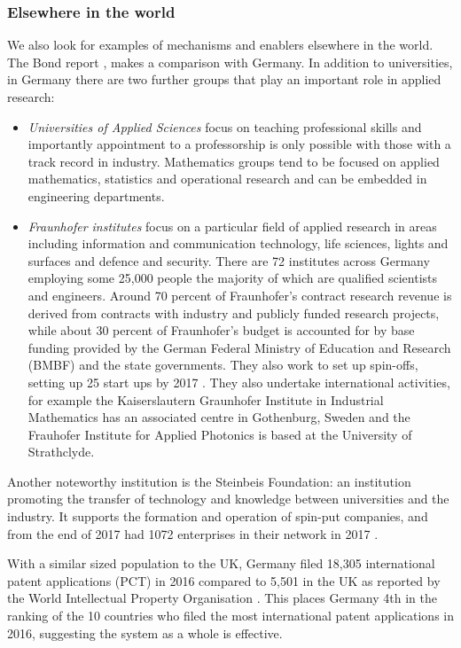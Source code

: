 \documentclass[11pt]{article} %
\begin{document}
	\subsubsection{Elsewhere in the world }	
	
	We also look for examples of mechanisms and enablers  elsewhere in the world. The Bond report \cite{Bond}, makes a comparison with Germany.   In addition to universities, in Germany there are two further groups that play an important role in applied research:
	\begin{itemize}
		\item \textit{Universities of Applied Sciences} focus on teaching professional skills and importantly appointment to a professorship is only possible with those with a track record in industry. Mathematics groups tend to be focused on applied mathematics, statistics and operational research and can be embedded in engineering departments. 
		\item \textit{Fraunhofer institutes} focus on a particular field of applied research in areas including information and communication technology, life sciences, lights and surfaces and defence and security. There are 72 institutes across Germany employing some 25,000 people the majority of which are qualified scientists and engineers. Around 70 percent of Fraunhofer’s contract research revenue is derived from contracts with industry and publicly funded research projects, while about	30 percent of Fraunhofer’s budget is accounted for by
		base funding provided by the German Federal Ministry of	Education and Research (BMBF) and the state governments. They also work to set up spin-offs, setting up 25 start ups by 2017 \cite{Thum2017}. They also undertake international activities, for example the Kaiserslautern Graunhofer Institute in Industrial Mathematics has an associated centre in Gothenburg, Sweden and the Frauhofer Institute for Applied Photonics is based at the University of Strathclyde. 
	\end{itemize}

	Another noteworthy institution is the Steinbeis Foundation: an institution promoting the transfer of technology and knowledge between universities and the industry. It supports the formation and operation of spin-put companies, and from the end of 2017 had 1072 enterprises in their network in 2017 \cite{Steinbeis}.
	
	With a similar sized population to the UK, Germany filed 18,305 international patent applications (PCT) in 2016 compared to 5,501 in the UK as reported by the World Intellectual Property Organisation \cite{WIPO}. This places Germany 4th in the ranking of the 10 countries who filed the most international patent applications in 2016, suggesting the system as a whole is effective. 
		
\end{document}
